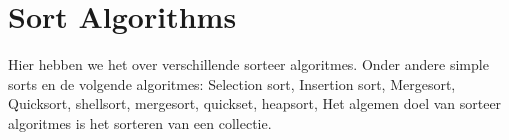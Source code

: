 \section{Sort Algorithms}
Hier hebben we het over verschillende sorteer algoritmes.
Onder andere simple sorts en de volgende algoritmes: Selection sort, Insertion sort, Mergesort, Quicksort, shellsort, mergesort, quickset, heapsort,
Het algemen doel van sorteer algoritmes is het sorteren van een collectie.
